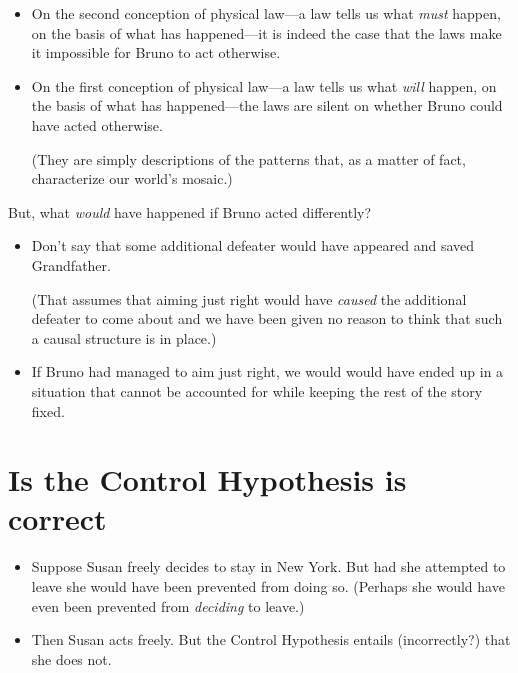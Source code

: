 \documentclass[12pt]{extarticle}
\begin{document}
\begin{itemize}


\item On the second conception of physical law---a law tells us what \emph{must} happen, on the basis of what has happened---it is indeed the case that the laws make it impossible for Bruno to act otherwise. 

\item On the first conception of physical law---a law tells us what \emph{will} happen, on the basis of what has happened---the laws are silent on whether Bruno could have acted otherwise. 

(They are simply descriptions of the patterns that, as a matter of fact, characterize our world's mosaic.)

\end{itemize}
But, what \emph{would} have happened if Bruno acted differently?


\begin{itemize}

\item Don't say that some additional defeater would have appeared and saved Grandfather. 

(That assumes that aiming just right would have \emph{caused} the additional defeater to come about and we have been given no reason to think that such a causal structure is in place.)

\item If Bruno had managed to aim just right, we would would have ended up in a situation that cannot be accounted for while keeping the rest of the story fixed. 

\end{itemize}



\section{Is the Control Hypothesis is correct}

\begin{itemize}
\item Suppose Susan freely decides to stay in New York. But had she attempted to leave she would have been prevented from doing so. (Perhaps she would have even been prevented from \emph{deciding} to leave.)

\item Then Susan acts freely. But the Control Hypothesis entails (incorrectly?) that she does not.

\end{itemize}
\end{document}
